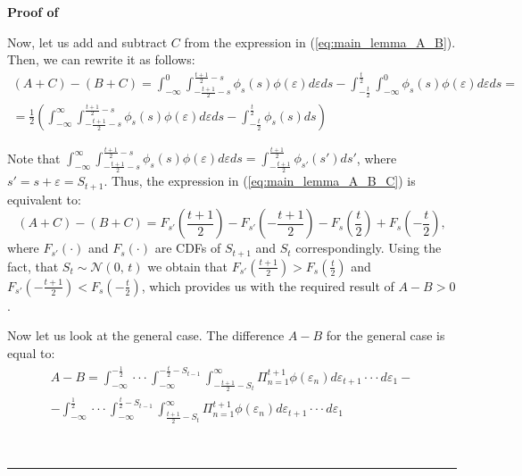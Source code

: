 \documentclass[12pt]{article}
\newenvironment{proof}[1][Proof of]{\noindent\textbf{#1} }{\ \rule{0.5em}{0.5em}}
\begin{document}
\begin{proof}
\begin{enumerate}[label={\roman*})]
Now, let us add and subtract $C$ from the expression in (\ref{eq:main_lemma_A_B}). Then, we can rewrite it as follows:
\begin{equation}\label{eq:main_lemma_A_B_C}
\begin{aligned}
(A+C)-(B+C) = 
\int_{-\infty}^{0}\int_{-\frac{t+1}{2}-s}^{\frac{t+1}{2}-s}\phi_{s}(s)\phi(\varepsilon)d\varepsilon ds
-
\int_{-\frac{t}{2}}^{\frac{t}{2}}\int_{-\infty}^{0}\phi_{s}(s)\phi(\varepsilon)d\varepsilon ds =\\
=
\frac{1}{2}\left(
\int_{-\infty}^{\infty}\int_{-\frac{t+1}{2}-s}^{\frac{t+1}{2}-s}\phi_{s}(s)\phi(\varepsilon)d\varepsilon ds
-
\int_{-\frac{t}{2}}^{\frac{t}{2}}\phi_{s}(s)ds  
\right)
\end{aligned}
\end{equation}

Note that $\int_{-\infty}^{\infty}\int_{-\frac{t+1}{2}-s}^{\frac{t+1}{2}-s}\phi_{s}(s)\phi(\varepsilon)d\varepsilon ds = \int_{-\frac{t+1}{2}}^{\frac{t+1}{2}}\phi_{s'}(s')ds'$, where $s'= s+\varepsilon = S_{t+1}$. Thus, the expression in (\ref{eq:main_lemma_A_B_C}) is equivalent to:
\begin{equation}
(A+C)-(B+C) = F_{s'}\left(\frac{t+1}{2}\right)-F_{s'}\left(-\frac{t+1}{2}\right)-F_{s}\left(\frac{t}{2}\right)+F_{s}\left(-\frac{t}{2}\right),
\end{equation}
where $F_{s'}(\cdot)$ and $F_{s}(\cdot)$ are CDFs of $S_{t+1}$ and $S_t$ correspondingly. Using the fact, that $S_{t} \sim \mathcal{N}(0,\,t)$ we obtain that $F_{s'}\left(\frac{t+1}{2}\right)> F_{s}\left(\frac{t}{2}\right)$ and $F_{s'}\left(-\frac{t+1}{2}\right)< F_{s}\left(-\frac{t}{2}\right)$, which provides us with the required result of $A-B>0$. 
 
Now let us look at the general case. The difference $A-B$ for the general case is equal to:
\begin{equation}\label{eq:lemma_main_general_statement}
\begin{aligned}
A - B = \int_{-\infty}^{-\frac{1}{2}} \cdot\cdot\cdot \int_{-\infty}^{-\frac{t}{2}-S_{t-1}}\int^{\infty}_{-\frac{t+1}{2}-S_{t}} \Pi_{n=1}^{t+1} \phi(\varepsilon_n) d\varepsilon_{t+1} \cdot \cdot \cdot d \varepsilon_{1} -\\
-
\int_{-\infty}^{\frac{1}{2}} \cdot\cdot\cdot \int_{-\infty}^{\frac{t}{2}-S_{t-1}}\int^{\infty}_{\frac{t+1}{2}-S_{t}} \Pi_{n=1}^{t+1} \phi(\varepsilon_n) d\varepsilon_{t+1} \cdot \cdot \cdot d \varepsilon_{1}
\end{aligned}
\end{equation} 


\end{enumerate}
\end{proof}
\end{document}
